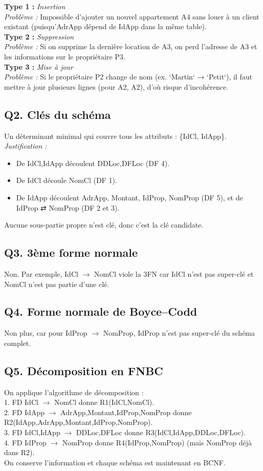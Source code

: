 \documentclass[a4paper,11pt]{article}
\begin{document}
\textbf{Type 1 :} \emph{Insertion}\\
\textit{Problème :} Impossible d'ajouter un nouvel appartement A4 sans louer à un client existant (puisqu'AdrApp dépend de IdApp dans la même table).\\[1em]

\textbf{Type 2 :} \emph{Suppression}\\
\textit{Problème :} Si on supprime la dernière location de A3, on perd l'adresse de A3 et les informations sur le propriétaire P3.\\[1em]

\textbf{Type 3 :} \emph{Mise à jour}\\
\textit{Problème :} Si le propriétaire P2 change de nom (ex. `Martin` → `Petit`), il faut mettre à jour plusieurs lignes (pour A2, A2), d'où risque d'incohérence.

\subsection*{Q2. Clés du schéma}
Un déterminant minimal qui couvre tous les attributs : \{IdCl, IdApp\}.\\
\textit{Justification :} 
\begin{itemize}
  \item De IdCl,IdApp découlent DDLoc,DFLoc (DF 4).
  \item De IdCl découle NomCl (DF 1).
  \item De IdApp découlent AdrApp, Montant, IdProp, NomProp (DF 5), et de IdProp ⇄ NomProp (DF 2 et 3).\\
\end{itemize}
Aucune sous-partie propre n'est clé, donc c'est la clé candidate.

\subsection*{Q3. 3ème forme normale}
Non. Par exemple, IdCl $\to$ NomCl viole la 3FN car IdCl n'est pas super-clé et NomCl n'est pas partie d'une clé.

\subsection*{Q4. Forme normale de Boyce–Codd}
Non plus, car pour IdProp $\to$ NomProp, IdProp n'est pas super-clé du schéma complet.

\subsection*{Q5. Décomposition en FNBC}
On applique l'algorithme de décomposition :\\
1. FD IdCl $\to$ NomCl donne R1(IdCl,NomCl).\\
2. FD IdApp $\to$ AdrApp,Montant,IdProp,NomProp donne R2(IdApp,AdrApp,Montant,IdProp,NomProp).\\
3. FD IdCl,IdApp $\to$ DDLoc,DFLoc donne R3(IdCl,IdApp,DDLoc,DFLoc).\\
4. FD IdProp $\to$ NomProp donne R4(IdProp,NomProp) (mais NomProp déjà dans R2).\\
On conserve l'information et chaque schéma est maintenant en BCNF.
\end{document}
